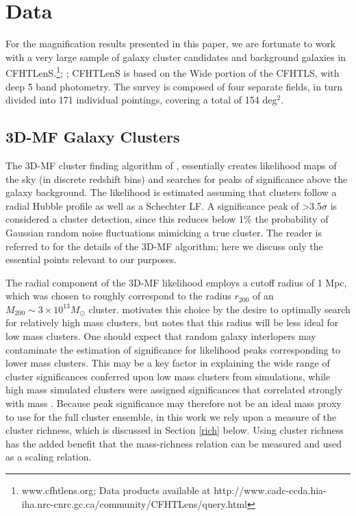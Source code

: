 
\section{Data}
\label{data}
For the magnification results presented in this paper, we are fortunate to work with a very large sample of galaxy cluster candidates and background galaxies in \ac{CFHTLenS}.\footnote[1]{www.cfhtlens.org; Data products available at http://www.cadc-ccda.hia-iha.nrc-cnrc.gc.ca/\-community/\-CFHTLens/\-query.html}; \citet{Erben13}; \citet{Hildebrandt12} \ac{CFHTLenS} is based on the Wide portion of the \acf{CFHTLS}, with deep 5 band photometry. The survey is composed of four separate fields, in turn divided into 171 individual pointings, covering a total of 154 deg$^2$.

\subsection{\ac{3D-MF} Galaxy Clusters}
\label{clusters}
The \ac{3D-MF} cluster finding algorithm of \citet{Milkeraitis10}, essentially creates likelihood maps of the sky (in discrete redshift bins) and searches for peaks of significance above the galaxy background. The likelihood is estimated assuming that clusters follow a radial Hubble profile as well as a Schechter \ac{LF}. A significance peak of \textgreater 3.5$\sigma$ is considered a cluster detection, since this reduces below 1\% the probability of Gaussian random noise fluctuations mimicking a true cluster. The reader is referred to \citet{Milkeraitis10} for the details of the \ac{3D-MF} algorithm; here we discuss only the essential points relevant to our purposes. 

The radial component of the \ac{3D-MF} likelihood employs a cutoff radius of 1 \ac{Mpc}, which was chosen to roughly correspond to the radius $r_{200}$ of an $M_{200} \sim 3 \times 10^{13} M_{\odot}$ cluster. \citet{Milkeraitis10} motivates this choice by the desire to optimally search for relatively high mass clusters, but notes that this radius will be less ideal for low mass clusters. One should expect that random galaxy interlopers may contaminate the estimation of significance for likelihood peaks corresponding to lower mass clusters. This may be a key factor in explaining the wide range of cluster significances conferred upon low mass clusters from simulations, while high mass simulated clusters were assigned significances that correlated strongly with mass \citep[see Figure 10 in][]{Milkeraitis10}. Because peak significance may therefore not be an ideal mass proxy to use for the full cluster ensemble, in this work we rely upon a measure of the cluster richness, which is discussed in Section \ref{rich} below. Using cluster richness has the added benefit that the mass-richness relation can be measured and used as a scaling relation.

